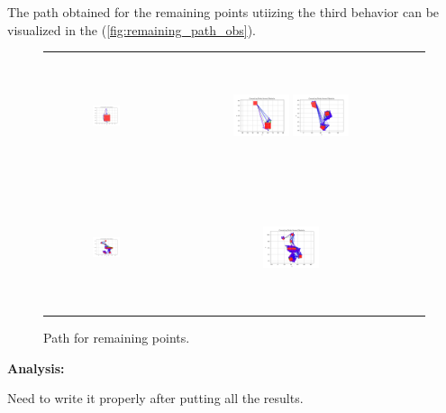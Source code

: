The path obtained for the remaining points utiizing the third behavior can be visualized in the (\autoref{fig:remaining_path_obs}). 

\begin{figure}[H]
    \centering
    \begin{tabular}{ccc} 
         \includegraphics[height=36mm,width=0.24\textwidth]{Images/simulation_obs/left_points_covered_obs/1.png}
        & \includegraphics[height=36mm,width=0.24\textwidth]{Images/simulation_obs/left_points_covered_obs/2.png}
         \includegraphics[height=36mm,width=0.24\textwidth]{Images/simulation_obs/left_points_covered_obs/3.png}\\[-4pt]

        \includegraphics[height=36mm,width=0.24\textwidth]{Images/simulation_obs/left_points_covered_obs/4.png}
        & \includegraphics[height=36mm,width=0.24\textwidth]{Images/simulation_obs/left_points_covered_obs/5.png} 

    \end{tabular}
    \caption{Path for remaining points.\label{fig:remaining_path_obs}} 
\end{figure}



\textbf{Analysis: }

Need to write it properly after putting all the results.  
